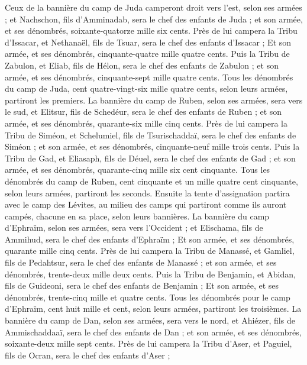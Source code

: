 \begin{multicols}{2}
Ceux de la bannière du camp de Juda camperont droit vers l'est, selon ses armées ; et Nachschon, fils d'Amminadab, sera le chef des enfants de Juda ;
et son armée, et ses dénombrés, soixante-quatorze mille six cents.
Près de lui campera la Tribu d'Issacar, et Nethanaël, fils de Tsuar, sera le chef des enfants d'Issacar ;
Et son armée, et ses dénombrés, cinquante-quatre mille quatre cents.
Puis la Tribu de Zabulon, et Eliab, fils de Hélon, sera le chef des enfants de Zabulon ;
et son armée, et ses dénombrés, cinquante-sept mille quatre cents.
Tous les dénombrés du camp de Juda, cent quatre-vingt-six mille quatre cents, selon leurs armées, partiront les premiers.
La bannière du camp de Ruben, selon ses armées, sera vers le sud, et Elitsur, fils de Schedéur, sera le chef des enfants de Ruben ;
et son armée, et ses dénombrés, quarante-six mille cinq cents.
Près de lui campera la Tribu de Siméon, et Schelumiel, fils de Tsurischaddaï, sera le chef des enfants de Siméon ;
et son armée, et ses dénombrés, cinquante-neuf mille trois cents.
Puis la Tribu de Gad, et Eliasaph, fils de Déuel, sera le chef des enfants de Gad ;
et son armée, et ses dénombrés, quarante-cinq mille six cent cinquante.
Tous les dénombrés du camp de Ruben, cent cinquante et un mille quatre cent cinquante, selon leurs armées, partiront les seconds.
Ensuite la tente d'assignation partira avec le camp des Lévites, au milieu des camps qui partiront comme ils auront campés, chacune en sa place, selon leurs bannières.
La bannière du camp d'Ephraïm, selon ses armées, sera vers l'Occident ; et Elischama, fils de Ammihud, sera le chef des enfants d'Ephraïm ;
Et son armée, et ses dénombrés, quarante mille cinq cents.
Près de lui campera la Tribu de Manassé, et Gamliel, fils de Pedahtsur, sera le chef des enfants de Manassé ;
et son armée, et ses dénombrés, trente-deux mille deux cents.
Puis la Tribu de Benjamin, et Abidan, fils de Guideoni, sera le chef des enfants de Benjamin ;
Et son armée, et ses dénombrés, trente-cinq mille et quatre cents.
Tous les dénombrés pour le camp d'Ephraïm, cent huit mille et cent, selon leurs armées, partiront les troisièmes.
La bannière du camp de Dan, selon ses armées, sera vers le nord, et Ahiézer, fils de Ammischaddaaï, sera le chef des enfants de Dan ;
et son armée, et ses dénombrés, soixante-deux mille sept cents.
Près de lui campera la Tribu d'Aser, et Paguiel, fils de Ocran, sera le chef des enfants d'Aser ;

\end{multicols}

